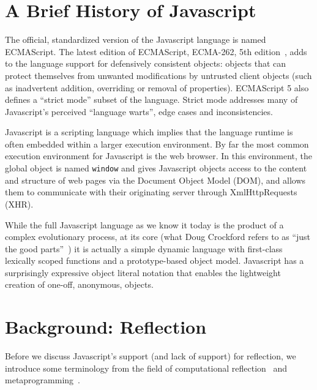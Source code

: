 \documentclass{acm_proc_article-sp}
\begin{document}
\section{A Brief History of Javascript}

The official, standardized version of the Javascript language is named ECMAScript. The latest edition of ECMAScript, ECMA-262, 5th edition~\cite{ecma262}, adds to the language support for defensively consistent objects: objects that can protect themselves from unwanted modifications by untrusted client objects (such as inadvertent addition, overriding or removal of properties). ECMAScript 5 also defines a ``strict mode'' subset of the language. Strict mode addresses many of Javascript's perceived ``language warts'', edge cases and inconsistencies.

Javascript is a scripting language which implies that the language runtime is often embedded within a larger execution environment. By far the most common execution environment for Javascript is the web browser. In this environment, the global object is named \texttt{window} and gives Javascript objects access to the content and structure of web pages via the Document Object Model (DOM), and allows them to communicate with their originating server through XmlHttpRequests (XHR).

While the full Javascript language as we know it today is the product of a complex evolutionary process, at its core (what Doug Crockford refers to as ``just the good parts''~\cite{crockford_goodparts}) it is actually a simple dynamic language with first-class lexically scoped functions and a prototype-based object model. Javascript has a surprisingly expressive object literal notation that enables the lightweight creation of one-off, anonymous, objects.

\section{Background: Reflection}

Before we discuss Javascript's support (and lack of support) for reflection, we introduce some terminology from the field of computational reflection~\cite{maes-oopsla87} and metaprogramming~\cite{kiczales-artofthemop}.
\end{document}
